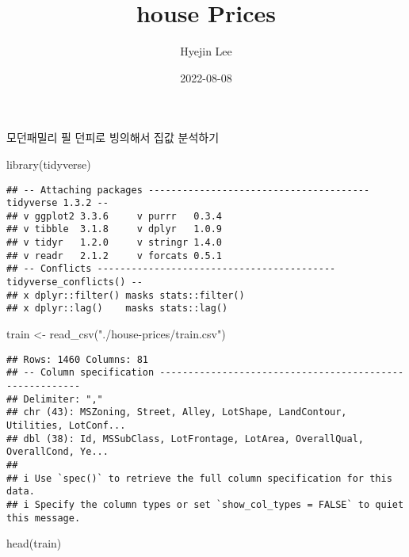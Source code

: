 \documentclass[
]{article}
\title{house Prices}
\author{Hyejin Lee}
\date{2022-08-08}
\newenvironment{Shaded}{\begin{snugshade}}{\end{snugshade}}
\newcommand{\FunctionTok}[1]{\textcolor[rgb]{0.00,0.00,0.00}{#1}}
\newcommand{\NormalTok}[1]{#1}
\newcommand{\OtherTok}[1]{\textcolor[rgb]{0.56,0.35,0.01}{#1}}
\newcommand{\StringTok}[1]{\textcolor[rgb]{0.31,0.60,0.02}{#1}}
\begin{document}
\maketitle

모던패밀리 필 던피로 빙의해서 집값 분석하기

\begin{Shaded}
\begin{Highlighting}[]
\FunctionTok{library}\NormalTok{(tidyverse)}
\end{Highlighting}
\end{Shaded}

\begin{verbatim}
## -- Attaching packages --------------------------------------- tidyverse 1.3.2 --
## v ggplot2 3.3.6     v purrr   0.3.4
## v tibble  3.1.8     v dplyr   1.0.9
## v tidyr   1.2.0     v stringr 1.4.0
## v readr   2.1.2     v forcats 0.5.1
## -- Conflicts ------------------------------------------ tidyverse_conflicts() --
## x dplyr::filter() masks stats::filter()
## x dplyr::lag()    masks stats::lag()
\end{verbatim}

\begin{Shaded}
\begin{Highlighting}[]
\NormalTok{train }\OtherTok{\textless{}{-}} \FunctionTok{read\_csv}\NormalTok{(}\StringTok{"./house{-}prices/train.csv"}\NormalTok{)}
\end{Highlighting}
\end{Shaded}

\begin{verbatim}
## Rows: 1460 Columns: 81
## -- Column specification --------------------------------------------------------
## Delimiter: ","
## chr (43): MSZoning, Street, Alley, LotShape, LandContour, Utilities, LotConf...
## dbl (38): Id, MSSubClass, LotFrontage, LotArea, OverallQual, OverallCond, Ye...
## 
## i Use `spec()` to retrieve the full column specification for this data.
## i Specify the column types or set `show_col_types = FALSE` to quiet this message.
\end{verbatim}

\begin{Shaded}
\begin{Highlighting}[]
\FunctionTok{head}\NormalTok{(train)}
\end{Highlighting}
\end{Shaded}
\end{document}
